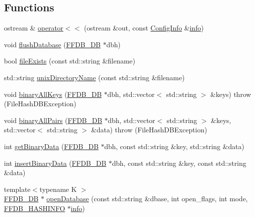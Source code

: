 \subsection*{Functions}
\begin{DoxyCompactItemize}
\item 
ostream \& \mbox{\hyperlink{namespaceFILEDB_ac5576dc30e75253b40f2dc1e148abb8b}{operator$<$$<$}} (ostream \&out, const \mbox{\hyperlink{classFILEDB_1_1ConfigInfo}{Config\+Info}} \&\mbox{\hyperlink{structinfo}{info}})
\item 
void \mbox{\hyperlink{namespaceFILEDB_a28e01191edebd63edee882e8c7af9325}{flush\+Database}} (\mbox{\hyperlink{other__libs_2filedb_2filehash_2ffdb__db_8h_a0b27b956926453a7a8141ea8e10f0df8}{F\+F\+D\+B\+\_\+\+DB}} $\ast$dbh)
\item 
bool \mbox{\hyperlink{namespaceFILEDB_ae588550e41a7b104b78a0e81ceb24a46}{file\+Exists}} (const std\+::string \&filename)
\item 
std\+::string \mbox{\hyperlink{namespaceFILEDB_a7e76510d94991fb0a4e18acc02214900}{unix\+Directory\+Name}} (const std\+::string \&filename)
\item 
void \mbox{\hyperlink{namespaceFILEDB_a208d694e308a85bd3b04277ffe369377}{binary\+All\+Keys}} (\mbox{\hyperlink{other__libs_2filedb_2filehash_2ffdb__db_8h_a0b27b956926453a7a8141ea8e10f0df8}{F\+F\+D\+B\+\_\+\+DB}} $\ast$dbh, std\+::vector$<$ std\+::string $>$ \&keys)  throw (\+File\+Hash\+D\+B\+Exception)
\item 
void \mbox{\hyperlink{namespaceFILEDB_ac242fd8f47258576482a692de8d1eaf3}{binary\+All\+Pairs}} (\mbox{\hyperlink{other__libs_2filedb_2filehash_2ffdb__db_8h_a0b27b956926453a7a8141ea8e10f0df8}{F\+F\+D\+B\+\_\+\+DB}} $\ast$dbh, std\+::vector$<$ std\+::string $>$ \&keys, std\+::vector$<$ std\+::string $>$ \&data)  throw (\+File\+Hash\+D\+B\+Exception)
\item 
int \mbox{\hyperlink{namespaceFILEDB_a0de8699301294566d0e11786f4016a2a}{get\+Binary\+Data}} (\mbox{\hyperlink{other__libs_2filedb_2filehash_2ffdb__db_8h_a0b27b956926453a7a8141ea8e10f0df8}{F\+F\+D\+B\+\_\+\+DB}} $\ast$dbh, const std\+::string \&key, std\+::string \&data)
\item 
int \mbox{\hyperlink{namespaceFILEDB_a517749615adc5aa798175fb429115366}{insert\+Binary\+Data}} (\mbox{\hyperlink{other__libs_2filedb_2filehash_2ffdb__db_8h_a0b27b956926453a7a8141ea8e10f0df8}{F\+F\+D\+B\+\_\+\+DB}} $\ast$dbh, const std\+::string \&key, const std\+::string \&data)
\item 
{\footnotesize template$<$typename K $>$ }\\\mbox{\hyperlink{other__libs_2filedb_2filehash_2ffdb__db_8h_a0b27b956926453a7a8141ea8e10f0df8}{F\+F\+D\+B\+\_\+\+DB}} $\ast$ \mbox{\hyperlink{namespaceFILEDB_a9ed602db52c9c9d3bbf1324426376c72}{open\+Database}} (const std\+::string \&dbase, int open\+\_\+flags, int mode, \mbox{\hyperlink{structFFDB__HASHINFO}{F\+F\+D\+B\+\_\+\+H\+A\+S\+H\+I\+N\+FO}} $\ast$\mbox{\hyperlink{structinfo}{info}})

\end{DoxyCompactItemize}
